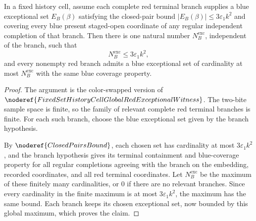 \begin{helper}
In a fixed history cell, assume each complete red terminal branch supplies a
blue exceptional set \(E_B(\beta)\) satisfying the closed-pair bound
\(|E_B(\beta)|\le 3\varepsilon_1 k^2\) and covering every blue present
staged-open coordinate of any regular independent completion of that branch.
Then there is one natural number \(N_B^{\mathrm{exc}}\), independent of the
branch, such that
\[
N_B^{\mathrm{exc}}\le 3\varepsilon_1 k^2,
\]
and every nonempty red branch admits a blue exceptional set of cardinality at
most \(N_B^{\mathrm{exc}}\) with the same blue coverage property.
\end{helper}
\begin{proof}
The argument is the color-swapped version of
\(\noderef{FixedSetHistoryCellGlobalRedExceptionalWitness}\).  The two-bite
sample space is finite, so the family of relevant complete red terminal
branches is finite.  For each such branch, choose the blue exceptional set
given by the branch hypothesis.

By \(\noderef{ClosedPairsBound}\), each chosen set has cardinality at most
\(3\varepsilon_1 k^2\), and the branch hypothesis gives its terminal
containment and blue-coverage property for all regular completions agreeing
with the branch on the embedding, recorded coordinates, and all red terminal
coordinates.  Let \(N_B^{\mathrm{exc}}\) be the maximum of these finitely many
cardinalities, or \(0\) if there are no relevant branches.  Since every
cardinality in the finite maximum is at most \(3\varepsilon_1 k^2\), the
maximum has the same bound.  Each branch keeps its chosen exceptional set,
now bounded by this global maximum, which proves the claim.
\end{proof}
